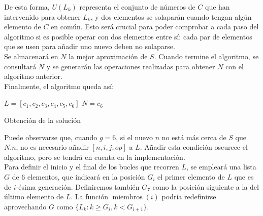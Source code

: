 De esta forma, $U(L_k)$ representa el conjunto de números de $C$ que han
intervenido para obtener $L_k$, y dos elementos se solaparán cuando tengan
algún elemento de $C$ en común. Esto será crucial para poder comprobar a cada
paso del algoritmo si es posible operar con dos elementos entre sí: cada par
de elementos que se usen para añadir uno nuevo deben no solaparse. \\

Se almacenará en $N$ la mejor aproximación de $S$. Cuando termine el
algoritmo, se consultará $N$ y se generarán las operaciones realizadas para
obtener $N$ con el algoritmo anterior.\\

Finalmente, el algoritmo queda así:\\

\begin{algorithm}[H]

$L = [c_1, c_2, c_3, c_4, c_5, c_6]$\;
$N = c_6$\;
\caption{Obtención de la solución}
\end{algorithm}

\vspace{0.4cm}

Puede observarse que, cuando $g = 6$, si el nuevo $n$ no está más cerca de $S$ que $N.n$, no es necesario añadir $[n,i,j,op]$ a $L$. Añadir esta condición oscurece el algoritmo, pero se tendrá en cuenta en la implementación.\\

Para definir el inicio y el final de los bucles que recorren $L$, se empleará una
lista $G$ de 6 elementos, que indicará en la posición $G_i$ el primer elemento
de $L$ que es de $i$-ésima generación. Definiremos también $G_7$ como la posición
siguiente a la del último elemento de $L$.
La función $\operatorname{miembros}(i)$ podría redefinirse aprovechando $G$ como
$\{L_k : k \ge G_i, k < G_{i+1}\}$. \\

